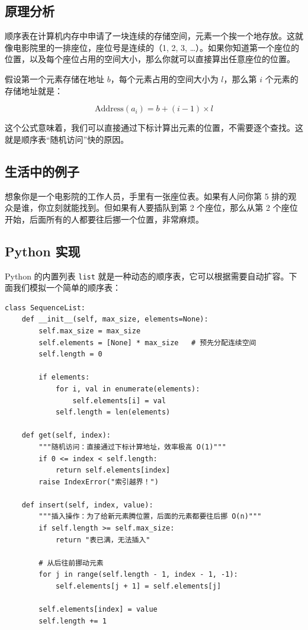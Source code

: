 \subsection{原理分析}

顺序表在计算机内存中申请了一块连续的存储空间，元素一个挨一个地存放。这就像电影院里的一排座位，座位号是连续的（1, 2, 3, …）。如果你知道第一个座位的位置，以及每个座位占用的空间大小，那么你就可以直接算出任意座位的位置。

假设第一个元素存储在地址 \(b\)，每个元素占用的空间大小为 \(l\)，那么第 \(i\) 个元素的存储地址就是：

\[
\text{Address}(a_i) = b + (i - 1) \times l
\]

这个公式意味着，我们可以直接通过下标计算出元素的位置，不需要逐个查找。这就是顺序表“随机访问”快的原因。

\subsection{生活中的例子}

想象你是一个电影院的工作人员，手里有一张座位表。如果有人问你第 5 排的观众是谁，你立刻就能找到。但如果有人要插队到第 2 个座位，那么从第 2 个座位开始，后面所有的人都要往后挪一个位置，非常麻烦。

\subsection{Python 实现}

Python 的内置列表 \texttt{list} 就是一种动态的顺序表，它可以根据需要自动扩容。下面我们模拟一个简单的顺序表：

\begin{verbatim}
class SequenceList:
    def __init__(self, max_size, elements=None):
        self.max_size = max_size
        self.elements = [None] * max_size   # 预先分配连续空间
        self.length = 0

        if elements:
            for i, val in enumerate(elements):
                self.elements[i] = val
            self.length = len(elements)

    def get(self, index):
        """随机访问：直接通过下标计算地址，效率极高 O(1)"""
        if 0 <= index < self.length:
            return self.elements[index]
        raise IndexError("索引越界！")

    def insert(self, index, value):
        """插入操作：为了给新元素腾位置，后面的元素都要往后挪 O(n)"""
        if self.length >= self.max_size:
            return "表已满，无法插入"

        # 从后往前挪动元素
        for j in range(self.length - 1, index - 1, -1):
            self.elements[j + 1] = self.elements[j]

        self.elements[index] = value
        self.length += 1
\end{verbatim}

